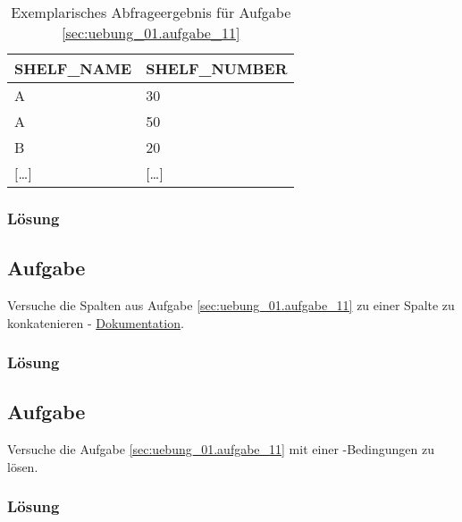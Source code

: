 \begin{table}[H]
  \ttfamily
  \begin{tabularx}{\textwidth}{X|X}
    \textbf{SHELF\_NAME} & \textbf{SHELF\_NUMBER} \\
    \hline\hline
    A & 30 \\
    A & 50 \\
    B & 20 \\
    $[$\dots$]$ & $[$\dots$]$ \\
  \end{tabularx}
  \caption{Exemplarisches Abfrageergebnis für Aufgabe \ref{sec:uebung_01.aufgabe_11}}
  \label{tbl:uebung_01.aufgabe_11}
\end{table}

\subsubsection*{Lösung}
\label{sec:uebung_01.aufgabe_11.loesung}


\subsection{Aufgabe}
\label{sec:uebung_01.aufgabe_12}
Versuche die Spalten aus Aufgabe \ref{sec:uebung_01.aufgabe_11} zu einer Spalte zu konkatenieren - \href{https://docs.oracle.com/cd/B19306_01/server.102/b14200/functions026.htm}{Dokumentation}.

\subsubsection*{Lösung}
\label{sec:uebung_01.aufgabe_12.loesung}

\subsection{Aufgabe}
\label{sec:uebung_01.aufgabe_13}
Versuche die Aufgabe \ref{sec:uebung_01.aufgabe_11} mit einer -Bedingungen zu lösen.

\subsubsection*{Lösung}
\label{sec:uebung_01.aufgabe_13.loesung}

